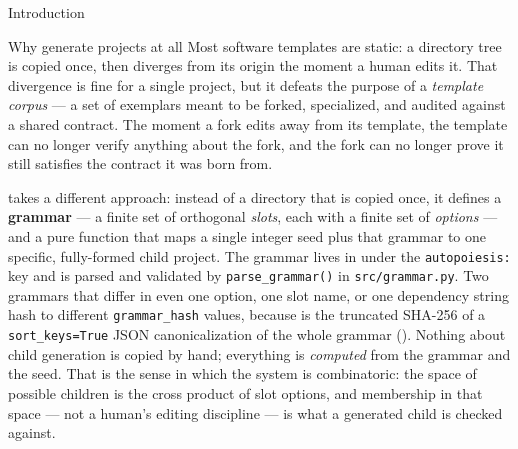 \documentclass[
  ignorenonframetext,
]{beamer}
\author{\texorpdfstring{}{}}
\date{}
\begin{document}
\begin{frame}{Introduction}
\protect{}\label{introduction}
\begin{block}{Why generate projects at all}
\protect{}\label{why-generate-projects-at-all}
Most software templates are static: a directory tree is copied once,
then diverges from its origin the moment a human edits it. That
divergence is fine for a single project, but it defeats the purpose of a
\emph{template corpus} --- a set of exemplars meant to be forked,
specialized, and audited against a shared contract. The moment a fork
edits away from its template, the template can no longer verify anything
about the fork, and the fork can no longer prove it still satisfies the
contract it was born from.

 takes a different approach: instead of a
directory that is copied once, it defines a \textbf{grammar} --- a
finite set of orthogonal \emph{slots}, each with a finite set of
\emph{options} --- and a pure function that maps a single integer seed
plus that grammar to one specific, fully-formed child project. The
grammar lives in  under the
\texttt{autopoiesis:} key and is parsed and validated by
\texttt{parse\_grammar()} in \texttt{src/grammar.py}. Two grammars that
differ in even one option, one slot name, or one dependency string hash
to different \texttt{grammar\_hash} values, because
 is the truncated SHA-256 of a
\texttt{sort\_keys=True} JSON canonicalization of the whole grammar
(). Nothing about child generation is copied
by hand; everything is \emph{computed} from the grammar and the seed.
That is the sense in which the system is combinatoric: the space of
possible children is the cross product of slot options, and membership
in that space --- not a human's editing discipline --- is what a
generated child is checked against.
\end{block}


\end{frame}
\end{document}
